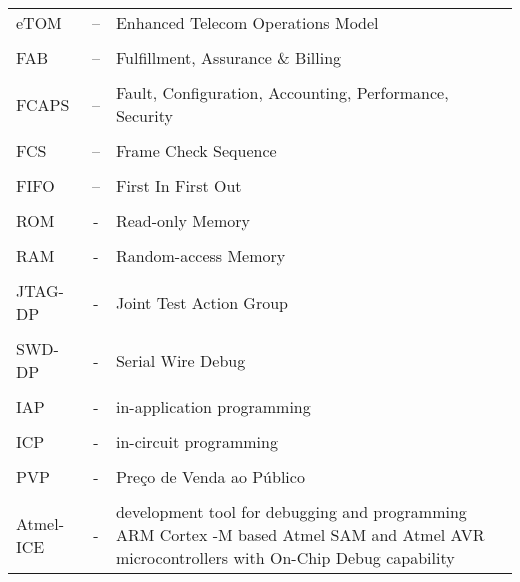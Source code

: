 \begin{table}[H]
\begin{adjustbox}{width=1\textwidth}
\begin{tabular}{ l c l }
			\\
			eTOM & – \hspace{1cm} & Enhanced Telecom Operations Model \\
			\\
			FAB & – \hspace{1cm} & Fulfillment, Assurance \& Billing \\
			\\
			FCAPS & – \hspace{1cm} & Fault, Configuration, Accounting, Performance, Security \\
			\\
			FCS & – \hspace{1cm} & Frame Check Sequence \\
			\\
			FIFO & – \hspace{1cm} & First In First Out \\
			\\
			ROM & - \hspace{1cm} & Read-only Memory \\
			\\
			RAM & - \hspace{1cm} & Random-access Memory \\
			\\
			JTAG-DP & - \hspace{1cm} & Joint Test Action Group \\
			\\
			SWD-DP & - \hspace{1cm} & Serial Wire Debug \\
			\\
			IAP & - \hspace{1cm} & in-application programming \\
			\\
			ICP & - \hspace{1cm} & in-circuit programming \\
			\\
			PVP & - \hspace{1cm} & Preço de Venda ao Público \\
			\\
			Atmel-ICE & - \hspace{1cm} & development tool for debugging and programming ARM\textsuperscript{\textregistered} Cortex\textsuperscript{\textregistered} -M based Atmel\textsuperscript{\textregistered} SAM and Atmel AVR\textsuperscript{\textregistered} microcontrollers with 	On-Chip Debug capability
		\end{tabular}
	\end{adjustbox}
\end{table}

